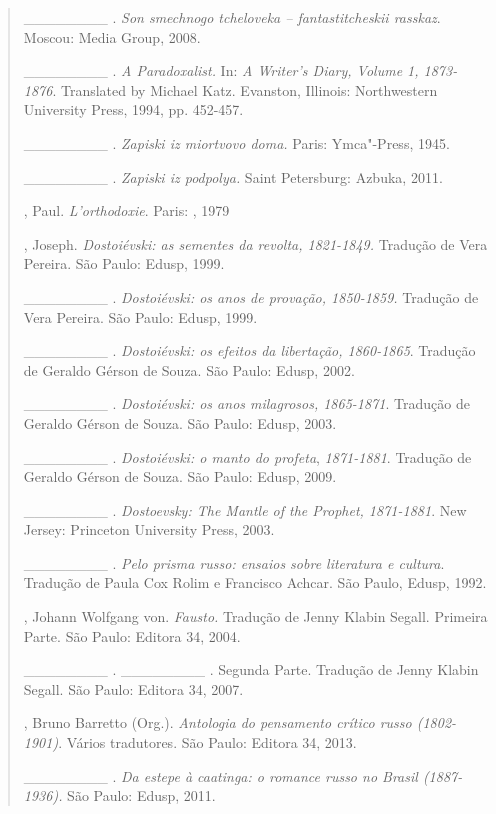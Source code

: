 {\begin{quote}
\begin{Parskip}
\_\_\_\_\_\_\_\_ . \emph{Son smechnogo tcheloveka -- fantastitcheskii
rasskaz}. Moscou:  Media Group, 2008.

\_\_\_\_\_\_\_\_ . \emph{A Paradoxalist.} In: \emph{A Writer's Diary,
Volume 1, 1873-1876}. Translated by Michael Katz. Evanston, Illinois:
Northwestern University Press, 1994, pp. 452-457.

\_\_\_\_\_\_\_\_ . \emph{Zapiski iz miortvovo doma.} Paris: Ymca"-Press,
1945.

\_\_\_\_\_\_\_\_ . \emph{Zapiski iz podpolya.} Saint Petersburg: Azbuka,
2011.

, Paul. \emph{L'orthodoxie}. Paris: , 1979

, Joseph. \emph{Dostoiévski: as sementes da revolta, 1821-1849.}
Tradução de Vera Pereira. São Paulo: Edusp, 1999.

\_\_\_\_\_\_\_\_ . \emph{Dostoiévski: os anos de provação, 1850-1859.}
Tradução de Vera Pereira. São Paulo: Edusp, 1999.

\_\_\_\_\_\_\_\_ . \emph{Dostoiévski: os efeitos da libertação,
1860-1865}. Tradução de Geraldo Gérson de Souza. São Paulo: Edusp, 2002.

\_\_\_\_\_\_\_\_ . \emph{Dostoiévski: os anos milagrosos, 1865-1871}.
Tradução de Geraldo Gérson de Souza. São Paulo: Edusp, 2003.

\_\_\_\_\_\_\_\_ . \emph{Dostoiévski: o manto do profeta},
\emph{1871-1881}. Tradução de Geraldo Gérson de Souza. São Paulo: Edusp,
2009.

\_\_\_\_\_\_\_\_ . \emph{Dostoevsky: The Mantle of the Prophet,
1871-1881}. New Jersey: Princeton University Press, 2003.

\_\_\_\_\_\_\_\_ . \emph{Pelo prisma russo: ensaios sobre literatura e
cultura}. Tradução de Paula Cox Rolim e Francisco Achcar. São Paulo,
Edusp, 1992.

, Johann Wolfgang von. \emph{Fausto.} Tradução de Jenny Klabin
Segall. Primeira Parte. São Paulo: Editora 34, 2004.

\_\_\_\_\_\_\_\_ . \_\_\_\_\_\_\_\_ . Segunda Parte. Tradução de Jenny
Klabin Segall. São Paulo: Editora 34, 2007.

, Bruno Barretto (Org.). \emph{Antologia do pensamento crítico
russo (1802-1901)}. Vários tradutores. São Paulo: Editora 34, 2013.

\_\_\_\_\_\_\_\_ . \emph{Da estepe à caatinga: o romance russo no Brasil
(1887-1936).} São Paulo: Edusp, 2011.


\end{Parskip}
\end{quote}}
